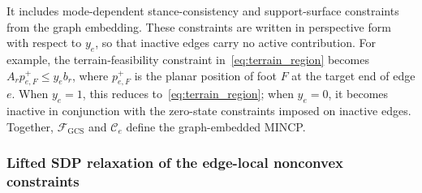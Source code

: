 \documentclass[letterpaper, 10 pt, journal, twoside]{IEEEtran}
\begin{document}
It includes mode-dependent stance-consistency and support-surface constraints from the graph embedding.
These constraints are written in perspective form with respect to $y_e$, so that inactive edges carry no active contribution.
For example, the terrain-feasibility constraint in~\eqref{eq:terrain_region} becomes \(A_r p_{e,F}^{+} \le y_e b_r\), where $p_{e,F}^{+}$ is the planar position of foot $F$ at the target end of edge $e$.
When $y_e=1$, this reduces to~\eqref{eq:terrain_region}; when $y_e=0$, it becomes inactive in conjunction with the zero-state constraints imposed on inactive edges.
Together, $\mathcal F_{\mathrm{GCS}}$ and $\mathcal C_e$ define the graph-embedded MINCP.

\subsubsection{Lifted SDP relaxation of the edge-local nonconvex constraints}
\end{document}
